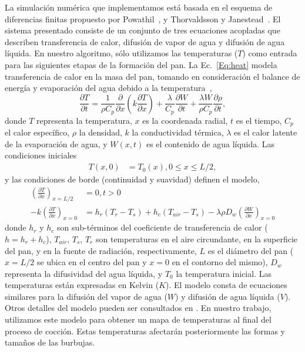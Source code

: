 La simulación numérica que implementamos está basada en el esquema de diferencias finitas propuesto por Powathil~\cite{Powathil2004}, y Thorvaldsson y Janestead~\cite{Thorvaldsson1999}. 
El sistema presentado consiste de un conjunto de tres ecuaciones acopladas que describen transferencia de calor, difusión de vapor de agua y difusión de agua líquida.
En nuestro algoritmo, sólo utilizamos las temperaturas ($T$) como entrada para las siguientes etapas de la formación del pan.
La Ec.~\ref{Eq:heat} modela transferencia de calor en la masa del pan, tomando en consideración el balance de energía y evaporación del agua debido a la temperatura~\cite{Thorvaldsson1999},
%
\begin{equation}
\label{Eq:heat}
\frac{\partial T}{\partial t} = \frac{1}{\rho C_{p}} \frac{\partial}{\partial x} \left ( k \frac{\partial T}{\partial x} \right ) + \frac{\lambda}{C_{p}} \frac{\partial W}{\partial t}+\frac{\lambda W}{ \rho C_{p} }\frac{\partial \rho}{\partial t},
\end{equation}
%
donde $T$ representa la temperatura, $x$ es la coordenada radial, $t$ es el tiempo, $C_{p}$ el calor específico, $\rho$ la densidad, $k$ la conductividad térmica, $\lambda$ es el calor latente de la evaporación de agua, y $W(x,t)$ es el contenido de agua líquida. 
Las condiciones iniciales
%
\begin{align*}
T(x,0) &= T_{0}(x), 0\le x \le L/2,
\end{align*}
y las condiciones de borde (continuidad y suavidad) definen el modelo,
\begin{align*}
\left ( \frac{\partial T}{\partial x} \right )_{x=L/2} &= 0 , t > 0 \\
-k \left ( \frac{\partial T}{\partial x} \right )_{x=0} &= h_{r}(T_{r}-T_{s}) + h_{c}(T_{air}-T_{s}) - \lambda \rho D_{w} \left (\frac{\partial W}{\partial x} \right )_{x=0}
\end{align*}
%
donde $h_{r}$ y $h_{c}$ son sub-términos del coeficiente de transferencia de calor ($h = h_{r}+h_{c}$), $T_{air}$, $T_{s}$, $T_{r}$ son temperaturas en el aire circundante, en la superficie del pan, y en la fuente de radiación, respectivamente, $L$ es el diámetro del pan ($x = L/2$ se ubica en el centro del pan y $x = 0$ en el contorno del mismo), $D_{w}$ representa la difusividad del agua líquida, y $T_{0}$ la temperatura inicial. 
Las temperaturas están expresadas en Kelvin ($K$). 
El modelo consta de ecuaciones similares para la difusión del vapor de agua ($W$) y difusión de agua líquida ($V$).
Otros detalles del modelo pueden ser consultados en \cite{Thorvaldsson1999}.
En nuestro trabajo, utilizamos este modelo para obtener un mapa de temperaturas al final del proceso de cocción.
Estas temperaturas afectarán posteriormente las formas y tamaños de las burbujas.

